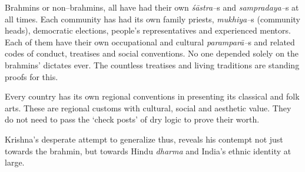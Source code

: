 Brahmins or non–brahmins, all have had their own \textit{śāstra–}s and \textit{sampradaya–}s at all times. Each community has had its own family priests, \textit{mukhiya–}s (community heads), democratic elections, people’s representatives and experienced mentors. Each of them have their own occupational and cultural \textit{paramparā–}s and related codes of conduct, treatises and social conventions. No one depended solely on the brahmins’ dictates ever. The countless treatises and living traditions are standing proofs for this.

Every country has its own regional conventions in presenting its classical and folk arts. These are regional customs with cultural, social and aesthetic value. They do not need to pass the ‘check posts’ of dry logic to prove their worth.

Krishna’s desperate attempt to generalize thus, reveals his contempt not just towards the brahmin, but towards Hindu \textit{dharma} and India’s ethnic identity at large.

